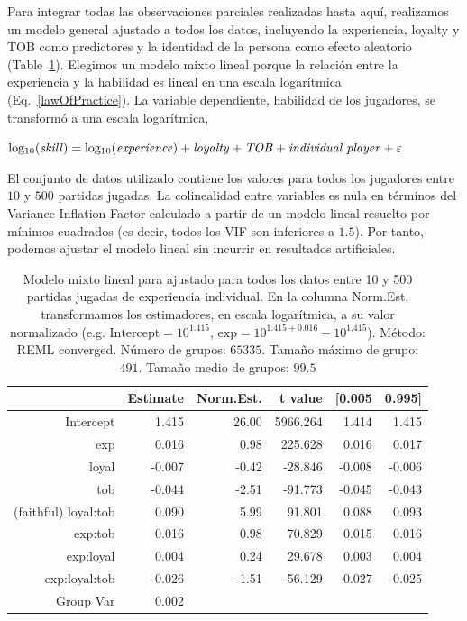 \documentclass[a4paper,11pt]{book}
\theoremstyle{definition}
\begin{document}

Para integrar todas las observaciones parciales realizadas hasta aquí, realizamos un modelo general ajustado a todos los datos, incluyendo la experiencia, loyalty y TOB como predictores y la identidad de la persona como efecto aleatorio (Table~\ref{lmm}).
%
Elegimos un modelo mixto lineal porque la relación entre la experiencia y la habilidad es lineal en una escala logarítmica (Eq.~\ref{lawOfPractice}).
%
La variable dependiente, habilidad de los jugadores, se transformó a una escala logarítmica,

\begin{center}
$\text{log$_{10}$(\emph{skill})} = \text{log$_{10}$(\emph{experience})} + \text{\emph{loyalty}} + \text{\emph{TOB}} + \text{\emph{individual player}} + \varepsilon$
\end{center}

El conjunto de datos utilizado contiene los valores para todos los jugadores entre $10$ y $500$ partidas jugadas.
%
La colinealidad entre variables es nula en términos del Variance Inflation Factor calculado a partir de un modelo lineal resuelto por mínimos cuadrados (es decir, todos los VIF son inferiores a $1.5$).
%
Por tanto, podemos ajustar el modelo lineal sin incurrir en resultados artificiales.

\begin{table}[ht!]
\centering
\begin{tabular}{rrrrrr}

 & Estimate & Norm.Est. & t value  & [0.005 & 0.995] \\
  \hline
Intercept               &  1.415  &  26.00   & 5966.264  &  1.414 &  1.415 \\
exp           		&  0.016  &   0.98   &  225.628  &  0.016 &  0.017 \\
loyal         		& -0.007  &  -0.42   &  -28.846  & -0.008 & -0.006 \\
tob           		& -0.044  &  -2.51   &  -91.773  & -0.045 & -0.043 \\
(faithful) loyal:tob    &  0.090  &   5.99   &   91.801  &  0.088 &  0.093 \\
exp:tob       		&  0.016  &   0.98   &   70.829  &  0.015 &  0.016 \\
exp:loyal     		&  0.004  &   0.24   &   29.678  &  0.003 &  0.004 \\
exp:loyal:tob 		& -0.026  &  -1.51   &  -56.129  & -0.027 & -0.025 \\
Group Var     		&  0.002  &          &           &        &       \\
   \hline
\end{tabular}
\caption{
Modelo mixto lineal para ajustado para todos los datos entre 10 y 500 partidas jugadas de experiencia individual.
%
En la columna Norm.Est. transformamos los estimadores, en escala logarítmica, a su valor normalizado (e.g. $\text{Intercept} = 10^{1.415}$, $\text{exp} = 10^{1.415+0.016} - 10^{1.415}$).
%
Método: REML converged. Número de grupos: $65335$. Tamaño máximo de grupo: $491$. Tamaño medio de grupos: $99.5$}
\label{lmm}
\end{table}
\end{document}
